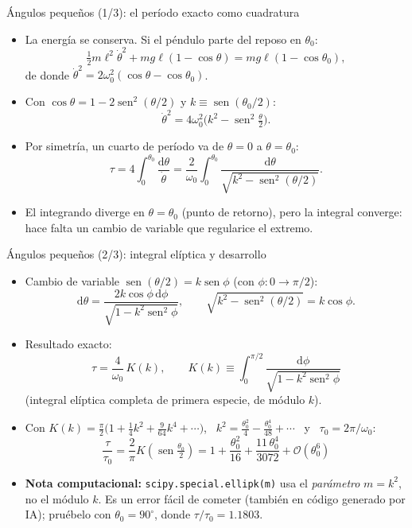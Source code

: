 \documentclass[spanish]{beamer}
\newcommand{\dd}{\mathrm{d}}
\begin{document}
\begin{frame}{Ángulos pequeños (1/3): el período exacto como cuadratura}
\begin{itemize}
\item<1-> La energía se conserva. Si el péndulo parte del reposo en $\theta_0$:
\[
\tfrac12 m\ell^2\dot\theta^2+mg\ell(1-\cos\theta)=mg\ell(1-\cos\theta_0),
\]
de donde $\dot\theta^2=2\omega_0^2(\cos\theta-\cos\theta_0)$.
\item<2-> Con $\cos\theta=1-2\operatorname{sen}^2(\theta/2)$ y $k\equiv\operatorname{sen}(\theta_0/2)$:
\[
\dot\theta^2=4\omega_0^2\big(k^2-\operatorname{sen}^2\tfrac{\theta}{2}\big).
\]
\item<3-> Por simetría, un cuarto de período va de $\theta=0$ a $\theta=\theta_0$:
\[
\tau=4\int_0^{\theta_0}\frac{\dd\theta}{\dot\theta}=\frac{2}{\omega_0}\int_0^{\theta_0}\frac{\dd\theta}{\sqrt{k^2-\operatorname{sen}^2(\theta/2)}} .
\]
\item<4-> El integrando diverge en $\theta=\theta_0$ (punto de retorno), pero la integral converge: hace falta un cambio de variable que regularice el extremo.
\end{itemize}
\end{frame}

\begin{frame}{Ángulos pequeños (2/3): integral elíptica y desarrollo}
\small
\begin{itemize}
\item<1-> Cambio de variable $\operatorname{sen}(\theta/2)=k\operatorname{sen}\phi$ (con $\phi:0\to\pi/2$):
\[
\dd\theta=\frac{2k\cos\phi\,\dd\phi}{\sqrt{1-k^2\operatorname{sen}^2\phi}},\qquad \sqrt{k^2-\operatorname{sen}^2(\theta/2)}=k\cos\phi .
\]
\item<2-> Resultado exacto:
\[
\tau=\frac{4}{\omega_0}\,K(k),\qquad K(k)\equiv\int_0^{\pi/2}\frac{\dd\phi}{\sqrt{1-k^2\operatorname{sen}^2\phi}}
\]
(integral elíptica completa de primera especie, de módulo $k$).
\item<3-> Con $K(k)=\tfrac{\pi}{2}\big(1+\tfrac14k^2+\tfrac{9}{64}k^4+\cdots\big)$, \ $k^2=\tfrac{\theta_0^2}{4}-\tfrac{\theta_0^4}{48}+\cdots$ \ y \ $\tau_0=2\pi/\omega_0$:
\[
\boxed{\;\frac{\tau}{\tau_0}=\frac{2}{\pi}K\!\left(\operatorname{sen}\tfrac{\theta_0}{2}\right)=1+\frac{\theta_0^2}{16}+\frac{11\,\theta_0^4}{3072}+\mathcal{O}(\theta_0^6)\;}
\]
\item<4-> \textbf{Nota computacional:} \texttt{scipy.special.ellipk(m)} usa el \emph{parámetro} $m=k^2$, no el módulo $k$. Es un error fácil de cometer (también en código generado por IA); pruébelo con $\theta_0=90^\circ$, donde $\tau/\tau_0=1.1803$.
\end{itemize}
\end{frame}
\end{document}
